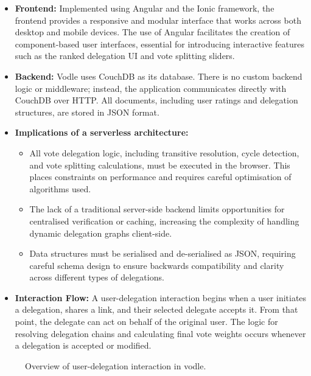 \begin{itemize}
  \item \textbf{Frontend:} Implemented using Angular and the Ionic framework, the frontend provides a responsive and modular interface that works across both desktop and mobile devices. The use of Angular facilitates the creation of component-based user interfaces, essential for introducing interactive features such as the ranked delegation UI and vote splitting sliders.
  \item \textbf{Backend:} Vodle uses CouchDB as its database. There is no custom backend logic or middleware; instead, the application communicates directly with CouchDB over HTTP. All documents, including user ratings and delegation structures, are stored in JSON format.
  \item \textbf{Implications of a serverless architecture:}
  \begin{itemize}
    \item All vote delegation logic, including transitive resolution, cycle detection, and vote splitting calculations, must be executed in the browser. This places constraints on performance and requires careful optimisation of algorithms used.
    \item The lack of a traditional server-side backend limits opportunities for centralised verification or caching, increasing the complexity of handling dynamic delegation graphs client-side.
    \item Data structures must be serialised and de-serialised as JSON, requiring careful schema design to ensure backwards compatibility and clarity across different types of delegations.
  \end{itemize}
  \item \textbf{Interaction Flow:} A user-delegation interaction begins when a user initiates a delegation, shares a link, and their selected delegate accepts it. From that point, the delegate can act on behalf of the original user. The logic for resolving delegation chains and calculating final vote weights occurs whenever a delegation is accepted or modified.
\end{itemize}

\begin{figure}[H]
  \centering
  \caption{Overview of user-delegation interaction in vodle.}
  \label{fig:delegation-architecture}
\end{figure}

